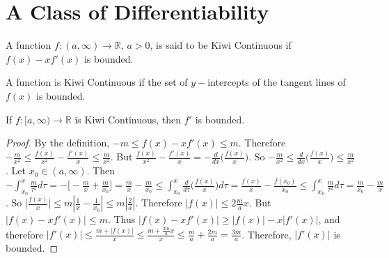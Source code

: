 \documentclass[crop=false,class=book,oneside]{standalone}
\begin{document}
        \section{A Class of Differentiability}
            \begin{definition}
                A function $f:(a,\infty)\rightarrow \mathbb{R}$, $a>0$, is said to be Kiwi Continuous if $f(x)-xf'(x)$ is bounded.
            \end{definition}
            \begin{remark}
                A function is Kiwi Continuous if the set of $y-$intercepts of the tangent lines of $f(x)$ is bounded.
            \end{remark}
            \begin{theorem}
                If $f:[a,\infty)\rightarrow \mathbb{R}$ is Kiwi Continuous, then $f'$ is bounded.
            \end{theorem}
            \begin{proof}
                By the definition, $-m \leq f(x)-xf'(x)\leq m$. Therefore $-\frac{m}{x^2} \leq \frac{f(x)}{x^2}- \frac{f'(x)}{x} \leq \frac{m}{x^2}$. But $\frac{f(x)}{x^2} - \frac{f'(x)}{x} = -\frac{d}{dx}\big(\frac{f(x)}{x}\big)$. So $-\frac{m}{x^2} \leq \frac{d}{dx}\big(\frac{f(x)}{x}\big) \leq \frac{m}{x^2}$. Let $x_0 \in (a,\infty)$. Then $-\int_{x_0}^x \frac{m}{\tau^2}d\tau = -\big[-\frac{m}{x}+ \frac{m}{x_0}\big] = \frac{m}{x}- \frac{m}{x_0} \leq \int_{x_0}^{x}\frac{d}{d\tau}\big(\frac{f(x)}{x}\big)d\tau = \frac{f(x)}{x} - \frac{f(x_0)}{x_0} \leq \int_{x_0}^{x} \frac{m}{\tau^2}d\tau = \frac{m}{x_0} - \frac{m}{x}$. So $\big|\frac{f(x)}{x}\big| \leq m|\frac{1}{x} - \frac{1}{x_0}| \leq m|\frac{2}{a}|$. Therefore $|f(x)| \leq 2\frac{m}{a}x$. But $|f(x) - xf'(x)| \leq m$. Thus $|f(x)-xf'(x)| \geq |f(x)| - x|f'(x)|$, and therefore $|f'(x)|  \leq \frac{m+|f(x)|}{x} \leq \frac{m+ \frac{2m}{a}x}{x} \leq \frac{m}{a} + \frac{2m}{a} = \frac{3m}{a}$. Therefore, $|f'(x)|$ is bounded.
            \end{proof}
\end{document}
